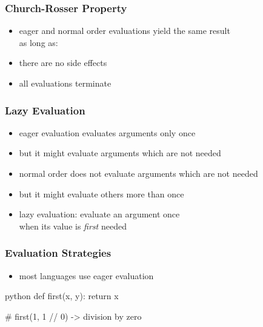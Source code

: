 \documentclass[dvipsnames]{beamer}
\theoremstyle{plain}
\begin{document}
\begin{frame}
  \frametitle{Church-Rosser Property}

  \begin{itemize}
    \item eager and normal order evaluations yield the same result\\
      as long as:

    \bigskip
    \item there are no side effects
    \item all evaluations terminate
  \end{itemize}
\end{frame}

\begin{frame}
  \frametitle{Lazy Evaluation}

  \begin{itemize}
    \item eager evaluation evaluates arguments only once
    \item but it might evaluate arguments which are not needed

    \pause
    \medskip
    \item normal order does not evaluate arguments which are not needed
    \item but it might evaluate others more than once

    \pause
    \medskip
    \item \alert{lazy evaluation}: evaluate an argument once\\
      when its value is \emph{first} needed
  \end{itemize}
\end{frame}

\begin{frame}[fragile]
  \frametitle{Evaluation Strategies}

  \begin{itemize}
    \item most languages use eager evaluation
  \end{itemize}

  \begin{example}[Python]
    \begin{pygments}{python}
def first(x, y):
    return x

# first(1, 1 // 0) -> division by zero
    \end{pygments}
  \end{example}
\end{frame}
\end{document}
